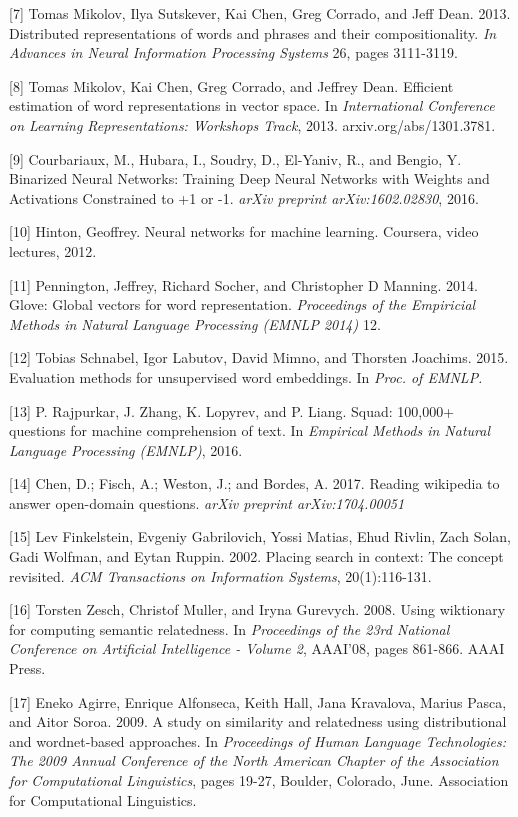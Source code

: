 \documentclass{article} %
\begin{document}
\small{[7] Tomas Mikolov, Ilya Sutskever, Kai Chen, Greg Corrado, and
  Jeff Dean. 2013. Distributed representations of words and phrases
  and their compositionality. {\it In Advances in Neural Information
  Processing Systems} 26, pages 3111-3119.}

\small{[8] Tomas Mikolov, Kai Chen, Greg Corrado, and Jeffrey
  Dean. Efficient estimation of word representations in vector
  space. In {\it International Conference on Learning Representations:
    Workshops Track}, 2013.  arxiv.org/abs/1301.3781.}

\small{[9] Courbariaux, M., Hubara, I., Soudry, D., El-Yaniv, R., and
  Bengio, Y. Binarized Neural Networks: Training Deep Neural Networks
  with Weights and Activations Constrained to +1 or -1. {\it arXiv preprint
  arXiv:1602.02830}, 2016.

\small{[10] Hinton, Geoffrey. Neural networks for machine
  learning. Coursera, video lectures, 2012.}

\small{[11] Pennington, Jeffrey, Richard Socher, and Christopher D
  Manning. 2014. Glove: Global vectors for word representation. {\it
    Proceedings of the Empiricial Methods in Natural Language
    Processing (EMNLP 2014)} 12.}

\small{[12] Tobias Schnabel, Igor Labutov, David Mimno, and Thorsten
  Joachims. 2015. Evaluation methods for unsupervised word embeddings.
  In {\it Proc. of EMNLP.}}

\small{[13] P. Rajpurkar, J. Zhang, K. Lopyrev, and P. Liang. Squad:
  100,000+ questions for machine comprehension of text. In {\it Empirical
  Methods in Natural Language Processing (EMNLP)}, 2016.}

\small{[14] Chen, D.; Fisch, A.; Weston, J.; and Bordes, A. 2017.
  Reading wikipedia to answer open-domain questions. {\it arXiv preprint
  arXiv:1704.00051}}

\small{[15] Lev Finkelstein, Evgeniy Gabrilovich, Yossi Matias, Ehud
  Rivlin, Zach Solan, Gadi Wolfman, and Eytan Ruppin. 2002. Placing
  search in context: The concept revisited. {\it ACM Transactions on
    Information Systems}, 20(1):116-131.}

\small{[16] Torsten Zesch, Christof Muller, and Iryna Gurevych.
  2008. Using wiktionary for computing semantic relatedness. In {\it
    Proceedings of the 23rd National Conference on Artificial
    Intelligence - Volume 2}, AAAI'08, pages 861-866. AAAI Press.}

\small{[17] Eneko Agirre, Enrique Alfonseca, Keith Hall, Jana
  Kravalova, Marius Pasca, and Aitor Soroa. 2009.  A study on
  similarity and relatedness using distributional and wordnet-based
  approaches. In {\it Proceedings of Human Language Technologies: The
    2009 Annual Conference of the North American Chapter of the
    Association for Computational Linguistics}, pages 19-27, Boulder,
  Colorado, June. Association for Computational Linguistics.}

}
\end{document}
